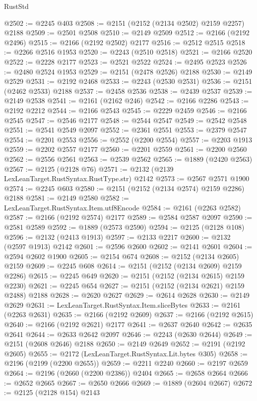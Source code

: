 \begin{lexlean}{RustStd}
\begin{coremodule}
@2502 := @2245 @403
@2508 := @2151 (@2152 (@2134 @2502) @2159 @2257) @2188
@2509 := @2501 @2508
@2510 := @2149 @2509
@2512 := @2166 (@2192 @2496)
@2515 := @2166 (@2192 @2502) @2177
@2516 := @2512 @2515
@2518 := @2266 @2516 @1953
@2520 := @2243 (@2510 @2518)
@2521 := @2166 @2520
@2522 := @2228 @2177
@2523 := @2521 @2522
@2524 := @2495 @2523
@2526 := @2480 @2524 @1953
@2529 := @2151 (@2478 @2526) @2188
@2530 := @2149 @2529
@2531 := @2192 @2468
@2533 := @2243 (@2530 @2531)
@2536 := @2151 (@2462 @2533) @2188
@2537 := @2458 @2536
@2538 := @2439 @2537
@2539 := @2149 @2538
@2541 := @2161 (@2162 @246)
@2542 := @2166 @2286
@2543 := @2192 @2212
@2544 := @2166 @2543
@2545 := @2229 @2459
@2546 := @2166 @2545
@2547 := @2546 @2177
@2548 := @2544 @2547
@2549 := @2542 @2548
@2551 := @2541 @2549 @2097
@2552 := @2361 @2551
@2553 := @2379 @2547
@2554 := @2201 @2553
@2556 := @2552 (@2200 @2554)
@2557 := @2203 @1913
@2559 := @2202 @2557 @2177
@2560 := @2201 @2559
@2561 := @2200 @2560
@2562 := @2556 @2561
@2563 := @2539 @2562
@2565 := @1889 (@2420 @2563)
@2567 := @2125 (@2128 @76)
@2571 := @2132 (@2139 LexLeanTarget.RustSyntax.RustType.str) @2142
@2573 := @2567 @2571 @1900
@2574 := @2245 @603
@2580 := @2151 (@2152 (@2134 @2574) @2159 @2286) @2188
@2581 := @2149 @2580
@2582 := LexLeanTarget.RustSyntax.Item.utf8Encode
@2584 := @2161 (@2263 @2582)
@2587 := @2166 (@2192 @2574) @2177
@2589 := @2584 @2587 @2097
@2590 := @2581 @2589
@2592 := @1889 (@2573 @2590)
@2594 := @2125 (@2128 @108)
@2596 := @2132 (@2413 @1913)
@2597 := @2133 @2217
@2600 := @2132 (@2597 @1913) @2142
@2601 := @2596 @2600
@2602 := @2141 @2601
@2604 := @2594 @2602 @1900
@2605 := @2154 @674
@2608 := @2152 (@2134 @2605) @2159
@2609 := @2245 @608
@2614 := @2151 (@2152 (@2134 @2609) @2159 @2286)
@2615 := @2245 @649
@2620 := @2151 (@2152 (@2134 @2615) @2159 @2230)
@2621 := @2245 @654
@2627 := @2151 (@2152 (@2134 @2621) @2159 @2488) @2188
@2628 := @2620 @2627
@2629 := @2614 @2628
@2630 := @2149 @2629
@2631 := LexLeanTarget.RustSyntax.Item.sliceBytes
@2633 := @2161 (@2263 @2631)
@2635 := @2166 (@2192 @2609)
@2637 := @2166 (@2192 @2615)
@2640 := @2166 (@2192 @2621) @2177
@2641 := @2637 @2640
@2642 := @2635 @2641
@2644 := @2633 @2642 @2097
@2646 := @2243 (@2630 @2644)
@2649 := @2151 (@2608 @2646) @2188
@2650 := @2149 @2649
@2652 := @2191 (@2192 @2605)
@2655 := @2172 (LexLeanTarget.RustSyntax.Lit.bytes @305)
@2658 := @2196 (@2199 (@2200 @2655))
@2659 := @2211 @2240
@2660 := @2197 @2659
@2664 := @2196 (@2660 (@2200 @2386)) @2404
@2665 := @2658 @2664
@2666 := @2652 @2665
@2667 := @2650 @2666
@2669 := @1889 (@2604 @2667)
@2672 := @2125 (@2128 @154) @2143

\end{coremodule}
\end{lexlean}
